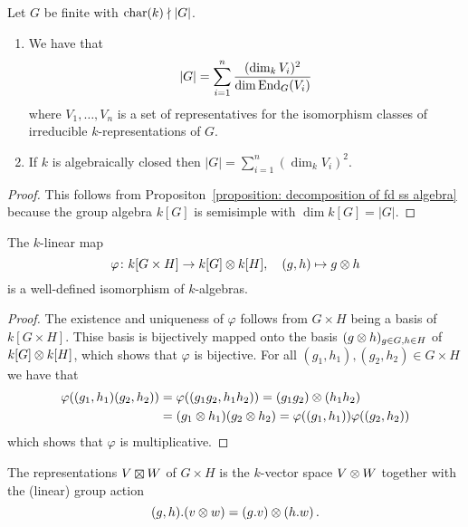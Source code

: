 \begin{lemma}
  \label{lemma: order of group decomposes into dim of irrep}
  Let $G$ be finite with $\operatorname{char}(k) \nmid |G|$.
  \begin{enumerate}
    \item
      We have that
      \[
          |G|
        = \sum_{i=1}^n \frac{ (\dim_k V_i)^2 }{\dim \operatorname{End}_G(V_i)}
      \]
      where $V_1, \dotsc, V_n$ is a set of representatives for the isomorphism classes of irreducible $k$-representations of $G$.
    \item
      If $k$ is algebraically closed then $|G| = \sum_{i=1}^n (\dim_k V_i)^2$.
  \end{enumerate}
\end{lemma}


\begin{proof}
  This follows from Propositon~\ref{proposition: decomposition of fd ss algebra} because the group algebra $k[G]$ is semisimple with $\dim k[G] = |G|$.
\end{proof}


\begin{lemma}
  \label{lemma: group algebra of product}
  The $k$-linear map
  \[
            \varphi
    \colon  k[G \times H]
    \to     k[G] \mathbin{\otimes} k[H],
    \quad   (g,h)
    \mapsto g \mathbin{\otimes} h
  \]
  is a well-defined isomorphism of $k$-algebras.
\end{lemma}


\begin{proof}
  The existence and uniqueness of $\varphi$ follows from $G \times H$ being a basis of $k[G \times H]$.
  Thise basis is bijectively mapped onto the basis $(g \mathbin{\otimes} h)_{g \in G, h \in H}$ of $k[G] \mathbin{\otimes} k[H]$, which shows that $\varphi$ is bijective.
  For all $(g_1, h_1), (g_2, h_2) \in G \times H$ we have that
  \begin{align*}
      \varphi((g_1, h_1) (g_2, h_2))
    &= \varphi((g_1 g_2, h_1 h_2))
     = (g_1 g_2) \mathbin{\otimes} (h_1 h_2)  \\
    &= (g_1 \mathbin{\otimes} h_1) (g_2 \mathbin{\otimes} h_2)
     = \varphi((g_1, h_1)) \varphi((g_2, h_2))
  \end{align*}
  which shows that $\varphi$ is multiplicative.
\end{proof}


\begin{definition}
  The representations $V \outertensor W$ of $G \times H$ is the $k$-vector space $V \mathbin{\otimes} W$ together with the (linear) group action
  \[
      (g,h).(v \mathbin{\otimes} w)
    = (g.v) \mathbin{\otimes} (h.w) \,.
  \]
\end{definition}


